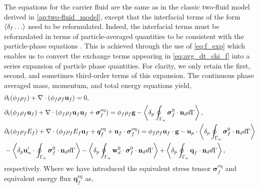 The equations for the carrier fluid are the same as in the classic two-fluid model derived in \ref{ap:two-fluid_model}, except that the interfacial terms of the form $\left<\delta_I \ldots \right>$ need to be reformulated.
Indeed, the interfacial terms must be reformulated in terms of particle-averaged quantities to be consistent with the particle-phase equations \citep{jackson1997locally,zhang1994averaged}. 
This is achieved through the use of \ref{eq:f_exp} which enables us to convert the exchange terms appearing in \ref{eq:avg_dt_chi_f} into a series expansion of particle phase quantities. 
For clarity, we only retain the first, second, and sometimes third-order terms of this expansion. 
The continuous phase averaged mass, momentum, and total energy equations yield, 
\begin{align}
    \label{eq:dt_hybrid_rho}
    &\pddt (\phi_f \rho_f)  
    + \div (
        \phi_f \rho_f\textbf{u}_f
    )
    = 
    0,\\
    \label{eq:dt_hybrid_rhou_f}
    &\pddt (\phi_f \rho_f\textbf{u}_f)  
    + \div (
        \phi_f \rho_f\textbf{u}_f\textbf{u}_f
        + \bm{\sigma}_f^\text{eq}
    )
    = 
    \phi_f \rho_f \textbf{g} 
    - \pSavg{{\bm{\sigma}_f^0 \cdot \textbf{n}_d}},
    \\
    \label{eq:dt_hybrid_rhoE_f}
    &\pddt (\phi_f\rho_fE_f)  
    + \div (
        \phi_f\rho_fE_f\textbf{u}_f
        + \bm{q}_f^\text{eq}
        + \textbf{u}_f \cdot \bm{\sigma}_f^\text{eq}
        )
    = 
    \phi_f \rho_f\textbf{u}_f \cdot \textbf{g} 
    - \textbf{u}_p \cdot \pSavg{{\bm{\sigma}_f^0 \cdot \textbf{n}_d}}\nonumber \\
    &- \pavg{ \textbf{u}_\alpha' \cdot \intS{  \bm{\sigma}_f^0 \cdot \textbf{n}_d}}
    - \pavg{ \intS{\textbf{w}_d^0 \cdot \bm{\sigma}_f^0 \cdot \textbf{n}_d}}
    + \pSavg{{\textbf{q}_f\cdot \textbf{n}_d}},
\end{align} 
respectively. 
Where we have introduced the equivalent stress tensor $\bm{\sigma}_f^\text{eq}$ and equivalent energy flux $\textbf{q}^\text{eq}_f$ as,
